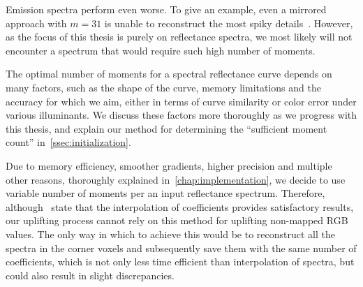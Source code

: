 Emission spectra perform even worse. To give an example, even a mirrored approach with $m=31$ is unable to reconstruct the most spiky details~\cite{trigonometricMomentsPaper}. However, as the focus of this thesis is purely on reflectance spectra, we most likely will not encounter a spectrum that would require such high number of moments.

The optimal number of moments for a spectral reflectance curve depends on many factors, such as the shape of the curve, memory limitations and the accuracy for which we aim, either in terms of curve similarity or color error under various illuminants. We discuss these factors more thoroughly as we progress with this thesis, and explain our method for determining the ``sufficient moment count'' in~\cref{ssec:initialization}.

Due to memory efficiency, smoother gradients, higher precision and multiple other reasons, thoroughly  explained in~\cref{chap:implementation}, we decide to use variable number of moments per an input reflectance spectrum. Therefore, although~\citet{trigonometricMomentsPaper} state that the interpolation of coefficients provides satisfactory results, our uplifting process cannot rely on this method for uplifting non-mapped RGB values. The only way in which to achieve this would be to reconstruct all the spectra in the corner voxels and subsequently save them with the same number of coefficients, which is not only less time efficient than interpolation of spectra, but could also result in slight discrepancies.

